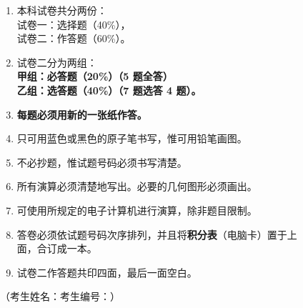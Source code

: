 \documentclass[12pt,a4paper]{exam-zh}
\newcommand{\ulinefill}[1]{\underline{\hspace{#1}}}
\begin{document}
\begin{enumerate}[label=（\arabic*）,leftmargin=2.8em,itemsep=0.38em]
  \item 本科试卷共分两份：\\
  \hspace*{1.3em}试卷一：选择题（40\%），\\
  \hspace*{1.3em}试卷二：作答题（60\%）。
    
    \item
  试卷二分为两组：\\
  \hspace*{1.3em}\textbf{甲组：必答题（20\%）（5 题全答）}\\
  \hspace*{1.3em}\textbf{乙组：选答题（40\%）（7 题选答 4 题）。}

  \item \textbf{每题必须用新的一张纸作答。}

  \item 只可用蓝色或黑色的原子笔书写，惟可用铅笔画图。

  \item 不必抄题，惟试题号码必须书写清楚。

  \item 所有演算必须清楚地写出。必要的几何图形必须画出。

  \item 可使用所规定的电子计算机进行演算，除非题目限制。

  \item 答卷必须依试题号码次序排列，并且将\textbf{积分表}（电脑卡）置于上\\
  面，合订成一本。

  \item 试卷二作答题共印四面，最后一面空白。
\end{enumerate}

\vspace{1.0em}

\begin{center}
  \fbox{\rule{0pt}{1.15em}\hspace{1.2em}{\bfseries 未经正式宣布\quad 不得翻看内页}\hspace{1.2em}}
\end{center}

\vspace{1.2em}

\noindent
（考生姓名：\ulinefill{4.4cm}\hfill 考生编号：\ulinefill{4.3cm}）


\newpage
\end{document}
